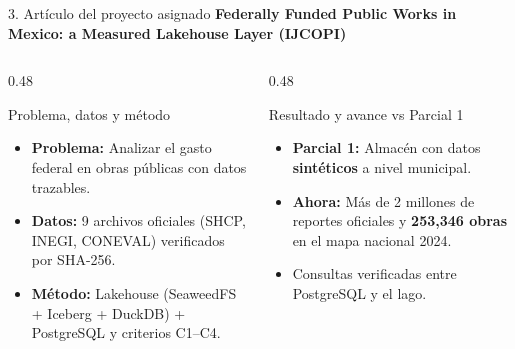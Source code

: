 \documentclass[aspectratio=169,11pt]{beamer}
\begin{document}
\begin{frame}{3. Artículo del proyecto asignado}
  \textbf{\color{AzulClaro}\small Federally Funded Public Works in Mexico: a Measured Lakehouse Layer (IJCOPI)}
  \vspace{0.25cm}
  \begin{columns}[T,totalwidth=\textwidth]
    \begin{column}{0.48\textwidth}
      \begin{block}{Problema, datos y método}
        \begin{itemize}
          \item \textbf{Problema:} Analizar el gasto federal en obras públicas con datos trazables.
          \item \textbf{Datos:} 9 archivos oficiales (SHCP, INEGI, CONEVAL) verificados por SHA-256.
          \item \textbf{Método:} Lakehouse (SeaweedFS + Iceberg + DuckDB) + PostgreSQL y criterios C1--C4.
        \end{itemize}
      \end{block}
    \end{column}

    \begin{column}{0.48\textwidth}
      \begin{exampleblock}{Resultado y avance vs Parcial 1}
        \begin{itemize}
          \item \textbf{Parcial 1:} Almacén con datos \textbf{sintéticos} a nivel municipal.
          \item \textbf{Ahora:} Más de 2 millones de reportes oficiales y \textbf{253,346 obras} en el mapa nacional 2024.
          \item Consultas verificadas entre PostgreSQL y el lago.
        \end{itemize}
      \end{exampleblock}
    \end{column}
  \end{columns}
\end{frame}
\end{document}
